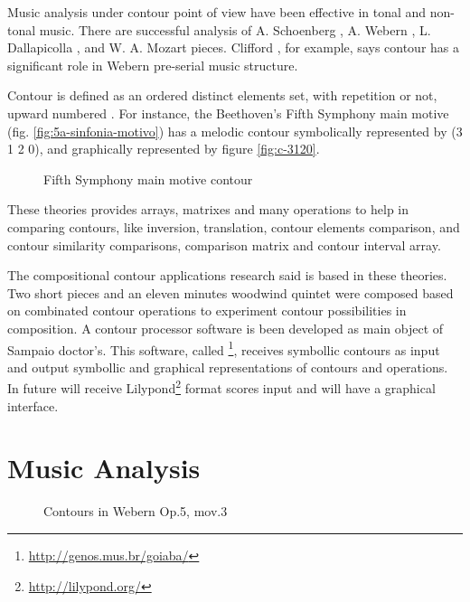 Music analysis under contour point of view have been effective in
tonal and non-tonal music. There are successful analysis of A.
Schoenberg \cite{friedmann85:methodology}, A. Webern
\cite{clifford95:contour}, L. Dallapicolla
\cite{marvin88:generalized}, and W. A. Mozart \cite{beard03:contour}
pieces. Clifford \cite{clifford95:contour}, for example, says contour
has a significant role in Webern pre-serial music structure.

Contour is defined as an ordered distinct elements set, with
repetition or not, upward numbered \cite{morris93:directions}. For
instance, the Beethoven's Fifth Symphony main motive
(fig. \ref{fig:5a-sinfonia-motivo}) has a melodic contour symbolically
represented by (3 1 2 0), and graphically represented by figure
\ref{fig:c-3120}.

\begin{figure}[!p]
  \centering
  \subfloat[Contour (3 1 2 0)]{
    \texttt{[image: c-3120]}
    \label{fig:c-3120}
  }
  \caption{Fifth Symphony main motive contour}
  \label{fig:5a-sinfonia}
\end{figure}

These theories provides arrays, matrixes and many operations to help
in comparing contours, like inversion, translation, contour elements
comparison, and contour similarity comparisons, comparison matrix and
contour interval array.

The compositional contour applications research said is based in these
theories. Two short pieces and an eleven minutes woodwind quintet were
composed based on combinated contour operations to experiment contour
possibilities in composition. A contour processor software is been
developed as main object of Sampaio doctor's. This software, called
\goiaba{}\footnote{\url{http://genos.mus.br/goiaba/}}, receives
symbollic contours as input and output symbollic and graphical
representations of contours and operations. In future \goiaba{} will
receive Lilypond\footnote{\url{http://lilypond.org/}} format scores
input and will have a graphical interface.

\section{Music Analysis}
\label{sec:music-analysis}

\begin{figure}[!p]
  \centering

  \quad
  \caption{Contours in Webern Op.5, mov.3}
  \label{fig:exemplos-webern}
\end{figure}


